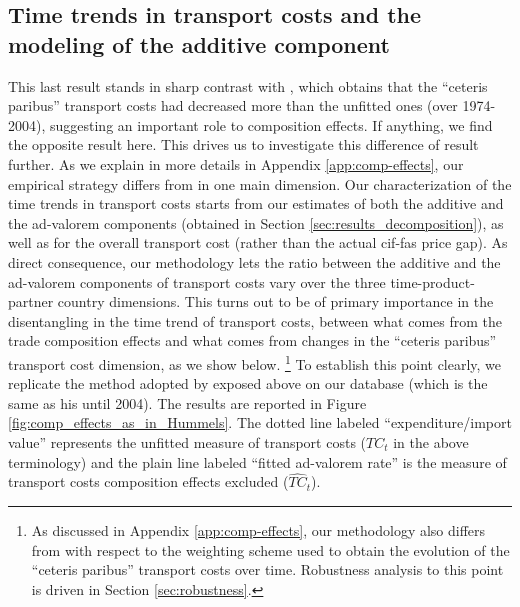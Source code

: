 \documentclass[a4paper,11pt]{article}
\begin{document}
\subsection{Time trends in transport costs and the modeling of the additive component}

This last result stands in sharp contrast with \citet{hummels2007}, which obtains that the ``ceteris paribus'' transport costs had decreased more than the unfitted ones (over 1974-2004), suggesting an important role to composition effects. If anything, we find the opposite result here. This drives us to investigate this difference of result further. As we explain in more details in Appendix \ref{app:comp-effects}, our empirical strategy differs from \cite{hummels2007} in one main dimension. Our characterization of the time trends in transport costs starts from our estimates of both the additive and the ad-valorem components (obtained in Section \ref{sec:results_decomposition}), as well as for the overall transport cost (rather than the actual cif-fas price gap). As direct consequence, our methodology lets the ratio between the additive and the ad-valorem components of transport costs vary over the three time-product-partner country dimensions. %
This turns out to be of primary importance in the disentangling in the time trend of transport costs, between what comes from the trade composition effects and what comes from changes in the ``ceteris paribus'' transport cost dimension, as we show below. \footnote{As discussed in Appendix \ref{app:comp-effects}, our methodology also differs from  \citet{hummels2007} with respect to the weighting scheme used to obtain the evolution of the ``ceteris paribus'' transport costs over time. Robustness analysis to this point is driven in Section \ref{sec:robustness}.} To establish this point clearly, we replicate the method adopted by \cite{hummels2007} exposed above on our database (which is the same as his until 2004). The results are reported in Figure \ref{fig:comp_effects_as_in_Hummels}. The dotted line labeled ``expenditure/import value'' represents the unfitted measure of transport costs ($TC_t$ in the above terminology) and the plain line labeled ``fitted ad-valorem rate'' is the measure of transport costs composition effects excluded ($\widehat{TC}_t$).
\end{document}
